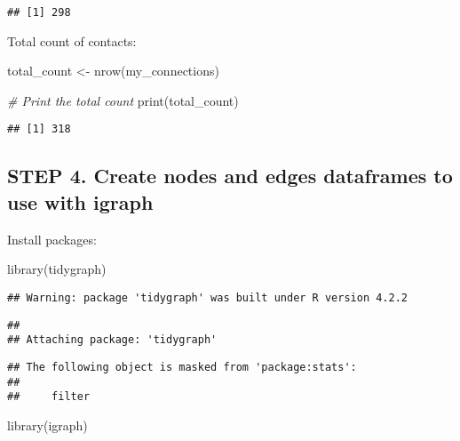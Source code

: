 \documentclass[
]{article}
\newenvironment{Shaded}{\begin{snugshade}}{\end{snugshade}}
\newcommand{\CommentTok}[1]{\textcolor[rgb]{0.56,0.35,0.01}{\textit{#1}}}
\newcommand{\FunctionTok}[1]{\textcolor[rgb]{0.00,0.00,0.00}{#1}}
\newcommand{\NormalTok}[1]{#1}
\newcommand{\OtherTok}[1]{\textcolor[rgb]{0.56,0.35,0.01}{#1}}
\begin{document}
\begin{verbatim}
## [1] 298
\end{verbatim}

Total count of contacts:

\begin{Shaded}
\begin{Highlighting}[]
\NormalTok{total\_count }\OtherTok{\textless{}{-}} \FunctionTok{nrow}\NormalTok{(my\_connections)}

\CommentTok{\# Print the total count}
\FunctionTok{print}\NormalTok{(total\_count)}
\end{Highlighting}
\end{Shaded}

\begin{verbatim}
## [1] 318
\end{verbatim}

\hypertarget{step-4.-create-nodes-and-edges-dataframes-to-use-with-igraph}{%
\subsection{STEP 4. Create nodes and edges dataframes to use with
igraph}\label{step-4.-create-nodes-and-edges-dataframes-to-use-with-igraph}}

Install packages:

\begin{Shaded}
\begin{Highlighting}[]
\FunctionTok{library}\NormalTok{(tidygraph)}
\end{Highlighting}
\end{Shaded}

\begin{verbatim}
## Warning: package 'tidygraph' was built under R version 4.2.2
\end{verbatim}

\begin{verbatim}
## 
## Attaching package: 'tidygraph'
\end{verbatim}

\begin{verbatim}
## The following object is masked from 'package:stats':
## 
##     filter
\end{verbatim}

\begin{Shaded}
\begin{Highlighting}[]
\FunctionTok{library}\NormalTok{(igraph)}
\end{Highlighting}
\end{Shaded}
\end{document}
